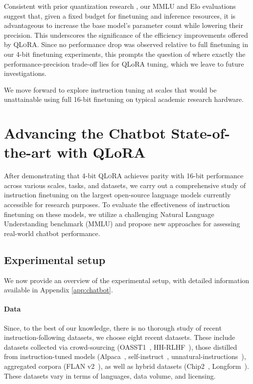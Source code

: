 Consistent with prior quantization research \citep{dettmers2022case}, our MMLU and Elo evaluations suggest that, given a fixed budget for finetuning and inference resources, it is advantageous to increase the base model’s parameter count while lowering their precision. This underscores the significance of the efficiency improvements offered by \textsc{QLoRA}. Since no performance drop was observed relative to full finetuning in our 4-bit finetuning experiments, this prompts the question of where exactly the performance-precision trade-off lies for QLoRA tuning, which we leave to future investigations.

We move forward to explore instruction tuning at scales that would be unattainable using full 16-bit finetuning on typical academic research hardware.

\section{Advancing the Chatbot State-of-the-art with QLoRA}
\label{sec:pushing}
After demonstrating that 4-bit \textsc{QLoRA} achieves parity with 16-bit performance across various scales, tasks, and datasets, we carry out a comprehensive study of instruction finetuning on the largest open-source language models currently accessible for research purposes. To evaluate the effectiveness of instruction finetuning on these models, we utilize a challenging Natural Language Understanding benchmark (MMLU) and propose new approaches for assessing real-world chatbot performance.

\subsection{Experimental setup} We now provide an overview of the experimental setup, with detailed information available in Appendix \ref{app:chatbot}.

\paragraph{Data} Since, to the best of our knowledge, there is no thorough study of recent instruction-following datasets, we choose eight recent datasets. These include datasets collected via crowd-sourcing (OASST1~\citep{kopf2023openassistant}, HH-RLHF~\citep{bai2022training}), those distilled from instruction-tuned models (Alpaca~\citep{alpaca}, self-instruct~\citep{wang2022self}, unnatural-instructions~\citep{honovich2022unnatural}), aggregated corpora (FLAN v2~\citep{chung2022scaling}), as well as hybrid datasets (Chip2~\citep{laion2023}, Longform~\citep{koksal2023longform}). These datasets vary in terms of languages, data volume, and licensing.

